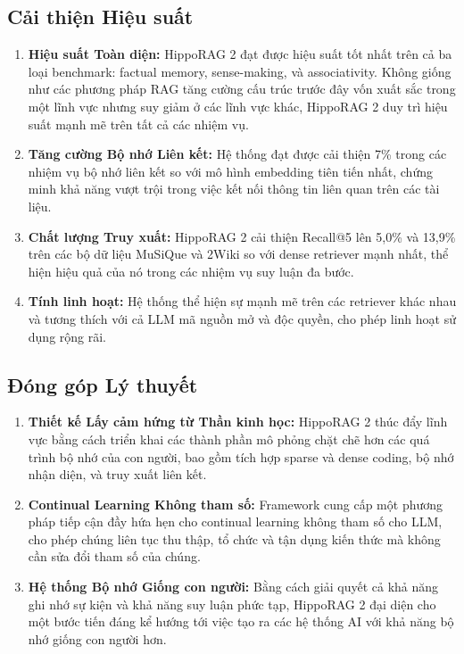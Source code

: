 \documentclass[../main.tex]{subfiles}
\begin{document}
\subsection{Cải thiện Hiệu suất}
\begin{enumerate}
\item \textbf{Hiệu suất Toàn diện:} HippoRAG 2 đạt được hiệu suất tốt nhất trên cả ba loại benchmark: factual memory, sense-making, và associativity. Không giống như các phương pháp RAG tăng cường cấu trúc trước đây vốn xuất sắc trong một lĩnh vực nhưng suy giảm ở các lĩnh vực khác, HippoRAG 2 duy trì hiệu suất mạnh mẽ trên tất cả các nhiệm vụ.

\item \textbf{Tăng cường Bộ nhớ Liên kết:} Hệ thống đạt được cải thiện 7\% trong các nhiệm vụ bộ nhớ liên kết so với mô hình embedding tiên tiến nhất, chứng minh khả năng vượt trội trong việc kết nối thông tin liên quan trên các tài liệu.

\item \textbf{Chất lượng Truy xuất:} HippoRAG 2 cải thiện Recall@5 lên 5,0\% và 13,9\% trên các bộ dữ liệu MuSiQue và 2Wiki so với dense retriever mạnh nhất, thể hiện hiệu quả của nó trong các nhiệm vụ suy luận đa bước.

\item \textbf{Tính linh hoạt:} Hệ thống thể hiện sự mạnh mẽ trên các retriever khác nhau và tương thích với cả LLM mã nguồn mở và độc quyền, cho phép linh hoạt sử dụng rộng rãi.
\end{enumerate}

\subsection{Đóng góp Lý thuyết}
\begin{enumerate}
\item \textbf{Thiết kế Lấy cảm hứng từ Thần kinh học:} HippoRAG 2 thúc đẩy lĩnh vực bằng cách triển khai các thành phần mô phỏng chặt chẽ hơn các quá trình bộ nhớ của con người, bao gồm tích hợp sparse và dense coding, bộ nhớ nhận diện, và truy xuất liên kết.

\item \textbf{Continual Learning Không tham số:} Framework cung cấp một phương pháp tiếp cận đầy hứa hẹn cho continual learning không tham số cho LLM, cho phép chúng liên tục thu thập, tổ chức và tận dụng kiến thức mà không cần sửa đổi tham số của chúng.

\item \textbf{Hệ thống Bộ nhớ Giống con người:} Bằng cách giải quyết cả khả năng ghi nhớ sự kiện và khả năng suy luận phức tạp, HippoRAG 2 đại diện cho một bước tiến đáng kể hướng tới việc tạo ra các hệ thống AI với khả năng bộ nhớ giống con người hơn.
\end{enumerate}
\end{document}
